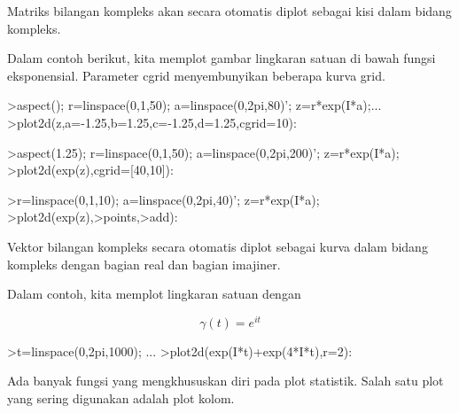 \documentclass[a4paper,10pt]{article}
\begin{document}
\begin{eulernotebook}
\begin{eulercomment}
\begin{eulercomment}
\begin{eulercomment}
\begin{eulercomment}
\begin{eulercomment}
Matriks bilangan kompleks akan secara otomatis diplot sebagai kisi
dalam bidang kompleks.

Dalam contoh berikut, kita memplot gambar lingkaran satuan di bawah
fungsi eksponensial. Parameter cgrid menyembunyikan beberapa kurva
grid.
\end{eulercomment}
\begin{eulerprompt}
>aspect(); r=linspace(0,1,50); a=linspace(0,2pi,80)'; z=r*exp(I*a);...
>plot2d(z,a=-1.25,b=1.25,c=-1.25,d=1.25,cgrid=10):
\end{eulerprompt}
\begin{eulerprompt}
>aspect(1.25); r=linspace(0,1,50); a=linspace(0,2pi,200)'; z=r*exp(I*a);
>plot2d(exp(z),cgrid=[40,10]):
\end{eulerprompt}
\begin{eulerprompt}
>r=linspace(0,1,10); a=linspace(0,2pi,40)'; z=r*exp(I*a);
>plot2d(exp(z),>points,>add):
\end{eulerprompt}
\begin{eulercomment}
Vektor bilangan kompleks secara otomatis diplot sebagai kurva dalam
bidang kompleks dengan bagian real dan bagian imajiner.

Dalam contoh, kita memplot lingkaran satuan dengan

\end{eulercomment}
\begin{eulerformula}
\[
\gamma(t) = e^{it}
\]
\end{eulerformula}
\begin{eulerprompt}
>t=linspace(0,2pi,1000); ...
>plot2d(exp(I*t)+exp(4*I*t),r=2):
\end{eulerprompt}
\begin{eulercomment}
Ada banyak fungsi yang mengkhususkan diri pada plot statistik. Salah
satu plot yang sering digunakan adalah plot kolom.


\end{eulercomment}
\end{eulercomment}
\end{eulercomment}
\end{eulercomment}
\end{eulercomment}
\end{eulernotebook}
\end{document}
